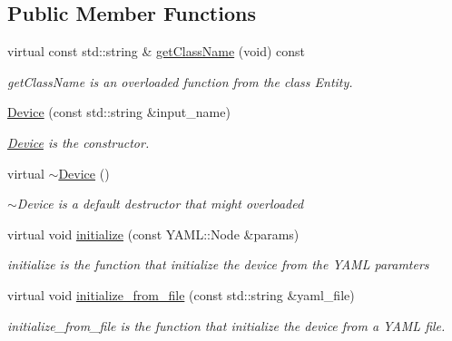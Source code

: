 \subsection*{Public Member Functions}
\begin{DoxyCompactItemize}
\item 
virtual const std\+::string \& \hyperlink{classdynamic__graph_1_1Device_af0e00dbc756e6191b2f5d6883187c92f}{get\+Class\+Name} (void) const
\begin{DoxyCompactList}\small\item\em get\+Class\+Name is an overloaded function from the class Entity. \end{DoxyCompactList}\item 
\hyperlink{classdynamic__graph_1_1Device_a76c80f6d47e2151494e375e2faf78c0d}{Device} (const std\+::string \&input\+\_\+name)
\begin{DoxyCompactList}\small\item\em \hyperlink{classdynamic__graph_1_1Device}{Device} is the constructor. \end{DoxyCompactList}\item 
\mbox{\label{classdynamic__graph_1_1Device_a9dabc419c8d8df3a686c33ce042bc99a}} 
virtual \hyperlink{classdynamic__graph_1_1Device_a9dabc419c8d8df3a686c33ce042bc99a}{$\sim$\+Device} ()
\begin{DoxyCompactList}\small\item\em $\sim$\+Device is a default destructor that might overloaded \end{DoxyCompactList}\item 
virtual void \hyperlink{classdynamic__graph_1_1Device_af6edd01afac2838c4e336c76caa4338a}{initialize} (const Y\+A\+M\+L\+::\+Node \&params)
\begin{DoxyCompactList}\small\item\em initialize is the function that initialize the device from the Y\+A\+ML paramters \end{DoxyCompactList}\item 
virtual void \hyperlink{classdynamic__graph_1_1Device_af71d151e69555e9530d770d3d90b7f3e}{initialize\+\_\+from\+\_\+file} (const std\+::string \&yaml\+\_\+file)
\begin{DoxyCompactList}\small\item\em initialize\+\_\+from\+\_\+file is the function that initialize the device from a Y\+A\+ML file. \end{DoxyCompactList}\item 

\end{DoxyCompactItemize}
